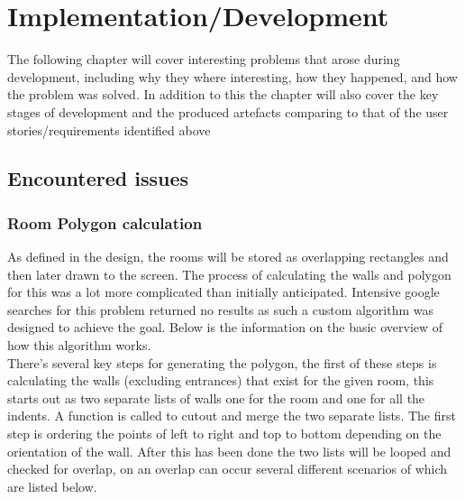 \section{Implementation/Development}
The following chapter will cover interesting problems that arose during development, including why they where interesting, how they happened, and how the problem was solved. In addition to this the chapter will also cover the key stages of development and the produced artefacts comparing to that of the user stories/requirements identified above

\subsection{Encountered issues}
\subsubsection{Room Polygon calculation}
As defined in the design, the rooms will be stored as overlapping rectangles and then later drawn to the screen. The process of calculating the walls and polygon for this was a lot more complicated than initially anticipated. Intensive google searches for this problem returned no results as such a custom algorithm was designed to achieve the goal. Below is the information on the basic overview of how this algorithm works.\\

There's several key steps for generating the polygon, the first of these steps is calculating the walls (excluding entrances) that exist for the given room, this starts out as two separate lists of walls one for the room and one for all the indents. A function is called to cutout and merge the two separate lists. The first step is ordering the points of left to right and top to bottom depending on the orientation of the wall. After this has been done the two lists will be looped and checked for overlap, on an overlap can occur several different scenarios of which are listed below.


